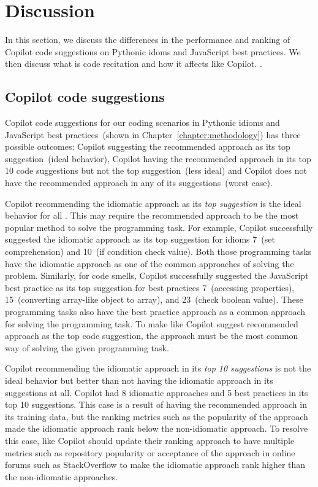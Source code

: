 \section{Discussion}
In this section, we discuss the differences in the performance and ranking of Copilot code suggestions on Pythonic idoms and JavaScript best practices. We then discuss what is code recitation and how it affects \cct{} like Copilot.
.
\subsection{Copilot code suggestions}
\label{performance}
Copilot code suggestions for our coding scenarios in Pythonic idioms and JavaScript best practices~(shown in Chapter~\ref{chapter:methodology}) has three possible outcomes: Copilot suggesting the recommended approach as its top suggestion~(ideal behavior), Copilot having the recommended approach in its top 10 code suggestions but not the top suggestion~(less ideal) and Copilot does not have the recommended approach in any of its suggestions~(worst case).

Copilot recommending the idiomatic approach as its \emph{top suggestion} is the ideal behavior for all \cct{}.
This may require the recommended approach to be the most popular method to solve the programming task. For example, Copilot successfully suggested the idiomatic approach as its top suggestion for idioms 7~(set comprehension) and 10~(if condition check value). 
Both those programming tasks have the idiomatic approach as one of the common approaches of solving the problem. Similarly, for code smells, Copilot successfully suggested the JavaScript best practice as its top suggestion for best practices 7~(accessing properties), 15~(converting array-like object to array), and 23~(check boolean value). These programming tasks also have the best practice approach as a common approach for solving the programming task. 
To make \cct{} like Copilot suggest recommended approach as the top code suggestion, the approach must be the most common way of solving the given programming task. 

Copilot recommending the idiomatic approach in its \emph{top 10 suggestions} is not the ideal behavior but better than not having the idiomatic approach in its suggestions at all. 
Copilot had 8 idiomatic approaches and 5 best practices in its top 10 suggestions. This case is a result of \cct{} having the recommended approach in its training data, but the ranking metrics such as the popularity of the approach made the idiomatic approach rank below the non-idiomatic approach. 
To resolve this case, \cct{} like Copilot should update their ranking approach to have multiple metrics such as repository popularity or acceptance of the approach in online forums such as StackOverflow to make the idiomatic approach rank higher than the non-idiomatic approaches.

